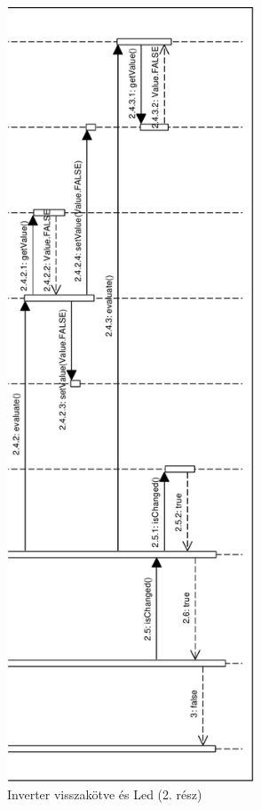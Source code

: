 \begin{figure}[H]
\includegraphics[height=23cm]{chapters/chapter05/imgs/test4-2.pdf}
\caption{Inverter visszakötve és Led (2. rész)}
\label{fig:test4_2}
\end{figure}



